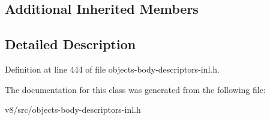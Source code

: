 \subsection*{Additional Inherited Members}


\subsection{Detailed Description}


Definition at line 444 of file objects-\/body-\/descriptors-\/inl.\+h.



The documentation for this class was generated from the following file\+:\begin{DoxyCompactItemize}
\item 
v8/src/objects-\/body-\/descriptors-\/inl.\+h\end{DoxyCompactItemize}
